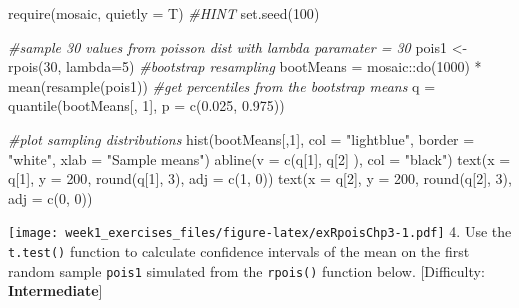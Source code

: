 \documentclass[
]{article}
\newenvironment{Shaded}{\begin{snugshade}}{\end{snugshade}}
\newcommand{\AttributeTok}[1]{\textcolor[rgb]{0.77,0.63,0.00}{#1}}
\newcommand{\CommentTok}[1]{\textcolor[rgb]{0.56,0.35,0.01}{\textit{#1}}}
\newcommand{\DecValTok}[1]{\textcolor[rgb]{0.00,0.00,0.81}{#1}}
\newcommand{\FloatTok}[1]{\textcolor[rgb]{0.00,0.00,0.81}{#1}}
\newcommand{\FunctionTok}[1]{\textcolor[rgb]{0.00,0.00,0.00}{#1}}
\newcommand{\NormalTok}[1]{#1}
\newcommand{\OtherTok}[1]{\textcolor[rgb]{0.56,0.35,0.01}{#1}}
\newcommand{\SpecialCharTok}[1]{\textcolor[rgb]{0.00,0.00,0.00}{#1}}
\newcommand{\StringTok}[1]{\textcolor[rgb]{0.31,0.60,0.02}{#1}}
\begin{document}
\begin{Shaded}
\begin{Highlighting}[]
\FunctionTok{require}\NormalTok{(mosaic, }\AttributeTok{quietly =}\NormalTok{ T)}
\CommentTok{\#HINT}
\FunctionTok{set.seed}\NormalTok{(}\DecValTok{100}\NormalTok{)}

\CommentTok{\#sample 30 values from poisson dist with lambda paramater = 30}
\NormalTok{pois1 }\OtherTok{\textless{}{-}} \FunctionTok{rpois}\NormalTok{(}\DecValTok{30}\NormalTok{, }\AttributeTok{lambda=}\DecValTok{5}\NormalTok{)}
\CommentTok{\#bootstrap resampling}
\NormalTok{bootMeans }\OtherTok{=}\NormalTok{ mosaic}\SpecialCharTok{::}\FunctionTok{do}\NormalTok{(}\DecValTok{1000}\NormalTok{) }\SpecialCharTok{*} \FunctionTok{mean}\NormalTok{(}\FunctionTok{resample}\NormalTok{(pois1))}
\CommentTok{\#get percentiles from the bootstrap means}
\NormalTok{q }\OtherTok{=} \FunctionTok{quantile}\NormalTok{(bootMeans[, }\DecValTok{1}\NormalTok{], }\AttributeTok{p =} \FunctionTok{c}\NormalTok{(}\FloatTok{0.025}\NormalTok{, }\FloatTok{0.975}\NormalTok{))}

\CommentTok{\#plot sampling distributions}
\FunctionTok{hist}\NormalTok{(bootMeans[,}\DecValTok{1}\NormalTok{], }\AttributeTok{col =} \StringTok{"lightblue"}\NormalTok{, }\AttributeTok{border =} \StringTok{"white"}\NormalTok{,}
                    \AttributeTok{xlab =} \StringTok{"Sample means"}\NormalTok{)}
\FunctionTok{abline}\NormalTok{(}\AttributeTok{v =} \FunctionTok{c}\NormalTok{(q[}\DecValTok{1}\NormalTok{], q[}\DecValTok{2}\NormalTok{] ), }\AttributeTok{col =} \StringTok{"black"}\NormalTok{)}
\FunctionTok{text}\NormalTok{(}\AttributeTok{x =}\NormalTok{ q[}\DecValTok{1}\NormalTok{], }\AttributeTok{y =} \DecValTok{200}\NormalTok{, }\FunctionTok{round}\NormalTok{(q[}\DecValTok{1}\NormalTok{], }\DecValTok{3}\NormalTok{), }\AttributeTok{adj =} \FunctionTok{c}\NormalTok{(}\DecValTok{1}\NormalTok{, }\DecValTok{0}\NormalTok{))}
\FunctionTok{text}\NormalTok{(}\AttributeTok{x =}\NormalTok{ q[}\DecValTok{2}\NormalTok{], }\AttributeTok{y =} \DecValTok{200}\NormalTok{, }\FunctionTok{round}\NormalTok{(q[}\DecValTok{2}\NormalTok{], }\DecValTok{3}\NormalTok{), }\AttributeTok{adj =} \FunctionTok{c}\NormalTok{(}\DecValTok{0}\NormalTok{, }\DecValTok{0}\NormalTok{))}
\end{Highlighting}
\end{Shaded}

\texttt{[image: week1\_exercises\_files/figure-latex/exRpoisChp3-1.pdf]}
4. Use the \texttt{t.test()} function to calculate confidence intervals
of the mean on the first random sample \texttt{pois1} simulated from the
\texttt{rpois()} function below. {[}Difficulty: \textbf{Intermediate}{]}
\end{document}
